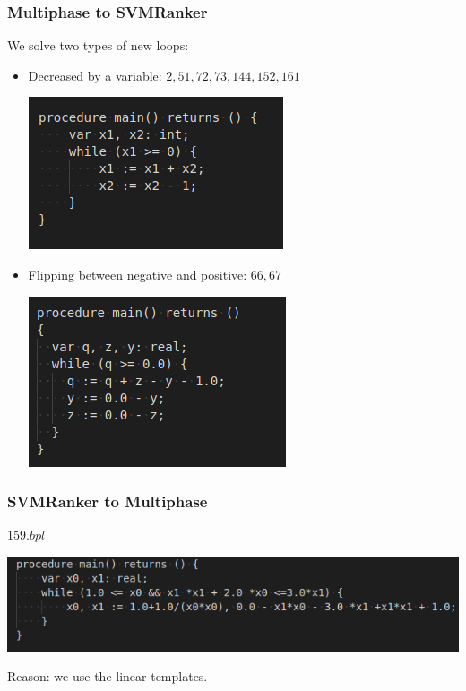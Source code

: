 \documentclass[10pt]{beamer}
\begin{document}
\begin{frame}\frametitle{Multiphase to SVMRanker}
We solve two types of new loops:
\begin{itemize}
\item Decreased by a variable: $2, 51,72,73,144,152,161$
\begin{center}
\includegraphics[scale=0.5]{2.png}
\end{center}
\item Flipping between negative and positive: $66,67$
\begin{center}
\includegraphics[scale=0.5]{66.png}
\end{center}
\end{itemize}
\end{frame}


\begin{frame}\frametitle{SVMRanker to Multiphase}
$159.bpl$

\begin{center}
\includegraphics[scale=0.5]{159.png}
\end{center}Reason: we use the linear templates.
\end{frame}
\end{document}
